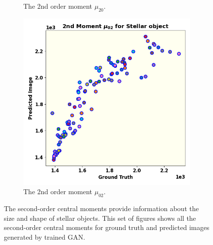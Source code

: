 \documentclass[fleqn,usenatbib,twocolumn]{mnras}
\begin{document}
\begin{figure}
\begin{subfigure}{0.33\linewidth}
		\caption{The 2nd order moment $\mu_{20}$.}
		\label{fig:mom5}
	\end{subfigure}\hfill
	\begin{subfigure}{0.33\linewidth}
		\includegraphics[width=\linewidth]{fig/moments/mom5.png}
		\caption{The 2nd order moment $\mu_{02}$.}
		\label{fig:mom6}
	\end{subfigure}\hfill
	\caption{The second-order central moments provide information about the size and shape of stellar objects. This set of figures shows all the second-order central moments for ground truth and predicted images generated by trained GAN.}
	\label{fig:struc}
\end{figure}
\end{document}
